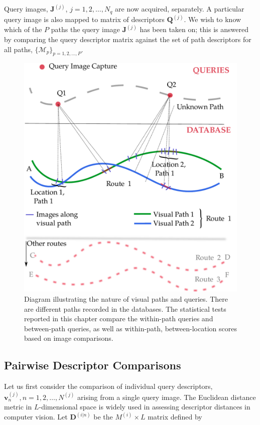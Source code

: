 Query images, $\mathbf{J}^{(j)}$, $j=1,2,\ldots,N_q$ are now acquired, separately.  A particular query image is also mapped to matrix of descriptors $\mathbf{Q}^{(j)}$. We wish to know which of the $P$ paths the query image $\mathbf{J}^{(j)}$ has been taken on; this is answered by comparing the query descriptor matrix against the set of path descriptors for all paths, $\lbrace \mathcal{M}_p \rbrace_{p=1,2,\ldots, P}$.

\begin{figure}
\centering
\includegraphics[width=\linewidth]{./gfx/Chapter02/pathexample.pdf}
\caption{Diagram illustrating the nature of visual paths and queries.  There are different paths recorded in the databases. The statistical tests reported in this chapter compare the within-path queries and between-path queries, as well as within-path, between-location scores based on image comparisons.}
\label{fig:pathexample}
\end{figure}


\subsection{Pairwise Descriptor Comparisons} \label{subsec:pairwise}

Let us first consider the comparison of individual query descriptors, $\mathbf{v}_n^{(j)}, n=1,2,\ldots,N^{(j)}$ arising from a single query image.  The Euclidean distance metric in $L$-dimensional space is widely used in assessing descriptor distances in computer vision.  Let $\mathbf{D}^{(i|n)}$ be the $M^{(i)}\times L$ matrix defined by

